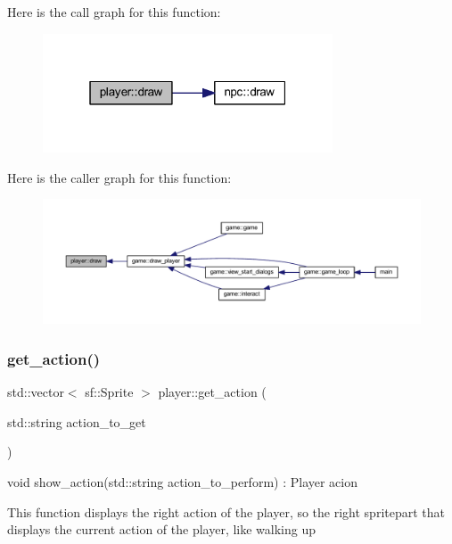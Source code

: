 Here is the call graph for this function\+:
\nopagebreak
\begin{figure}[H]
\begin{center}
\leavevmode
\includegraphics[width=244pt]{classplayer_a67423ce10d4abb42775868f978d04247_cgraph}
\end{center}
\end{figure}
Here is the caller graph for this function\+:
\nopagebreak
\begin{figure}[H]
\begin{center}
\leavevmode
\includegraphics[width=350pt]{classplayer_a67423ce10d4abb42775868f978d04247_icgraph}
\end{center}
\end{figure}
\mbox{\label{classplayer_a676129193d589a975d7a86429a37b1b7}} 
\subsubsection{\texorpdfstring{get\+\_\+action()}{get\_action()}}
{\footnotesize\ttfamily std\+::vector$<$ sf\+::\+Sprite $>$ player\+::get\+\_\+action (\begin{DoxyParamCaption}\item[{std\+::string}]{action\+\_\+to\+\_\+get }\end{DoxyParamCaption})}



void show\+\_\+action(std\+::string action\+\_\+to\+\_\+perform) \+: Player acion 

This function displays the right action of the player, so the right spritepart that displays the current action of the player, like walking up

